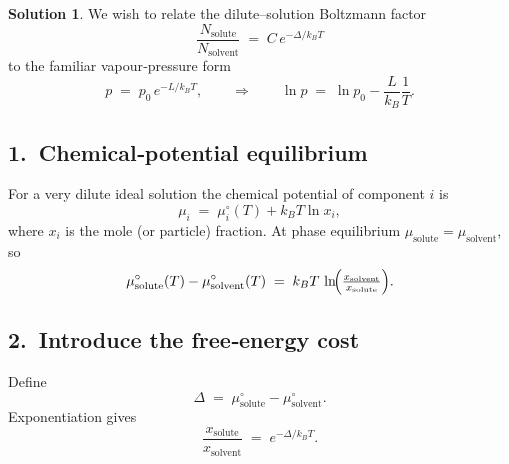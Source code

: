 \documentclass[12pt]{article}
\theoremstyle{definition} %
\newtheorem{solution}{Solution}
\theoremstyle{plain} %
\begin{document}
                              \begin{solution}
                                We wish to relate the dilute--solution Boltzmann factor
                                \[
                                  \frac{N_{\mathrm{solute}}}{N_{\mathrm{solvent}}}
                                  \;=\;
                                  C\,e^{-\Delta/k_{B}T}
                                  \tag{1}
                                \]
                                to the familiar vapour‐pressure form
                                \[
                                  p
                                  \;=\;
                                  p_{0}\,e^{-L/k_{B}T},
                                  \qquad
                                  \Longrightarrow\qquad
                                  \ln p
                                  \;=\;
                                  \ln p_{0}-\frac{L}{k_{B}}\frac{1}{T}.
                                  \tag{2}
                                \]
                                
                                \subsection*{1.\  Chemical‐potential equilibrium}
                                For a very dilute ideal solution the chemical potential of component $i$ is
                                \[
                                  \mu_{i}
                                  \;=\;
                                  \mu_{i}^{\circ}(T)+k_{B}T\ln x_{i},
                                \]
                                where $x_{i}$ is the mole (or particle) fraction.
                                At phase equilibrium
                                \(
                                  \mu_{\mathrm{solute}}=\mu_{\mathrm{solvent}}
                                \),
                                so
                                \[
                                  \mu_{\mathrm{solute}}^{\circ}(T)-\mu_{\mathrm{solvent}}^{\circ}(T)
                                  \;=\;
                                  k_{B}T\,
                                  \ln\!\Bigl(\tfrac{x_{\mathrm{solvent}}}{x_{\mathrm{solute}}}\Bigr).
                                \]
                                
                                \subsection*{2.\  Introduce the free‐energy cost}
                                Define
                                \[
                                  \Delta
                                  \;=\;
                                  \mu_{\mathrm{solute}}^{\circ}-\mu_{\mathrm{solvent}}^{\circ}.
                                \]
                                Exponentiation gives
                                \[
                                  \frac{x_{\mathrm{solute}}}{x_{\mathrm{solvent}}}
                                  \;=\;
                                  e^{-\Delta/k_{B}T}.
                                \]
                                

\end{solution}
\end{document}
